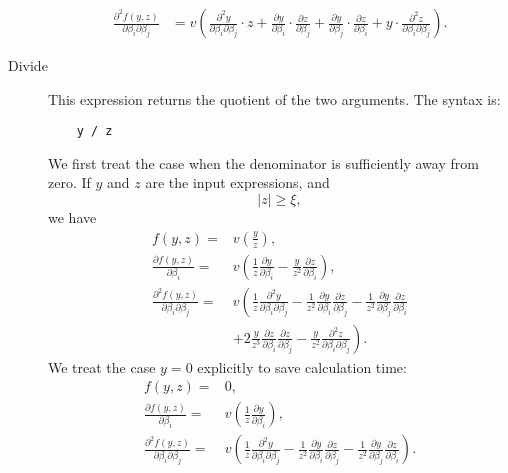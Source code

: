 \documentclass[12pt,a4paper]{article}
\begin{document}
\begin{description}
\begin{align*}
    \frac{\partial^2 f(y, z)}{\partial \beta_i \partial \beta_j} &= v\left(\frac{\partial^2 y}{\partial \beta_i \partial \beta_j} \cdot z + \frac{\partial y}{\partial \beta_i} \cdot \frac{\partial z}{\partial \beta_j} + \frac{\partial y}{\partial \beta_j} \cdot \frac{\partial z}{\partial \beta_i} + y \cdot \frac{\partial^2 z}{\partial \beta_i \partial \beta_j} \right).
  \end{align*}
\item[Divide] This expression returns the quotient of the two arguments. The syntax is: 
  \begin{lstlisting}
    y / z
  \end{lstlisting}

 We first treat the case when the denominator is sufficiently away from zero.        If $y$ and $z$ are the input expressions, and
  \[
  |z| \geq \xi,
  \]
  we have
  \begin{align*}
    f(y, z) =& v\left(\frac{y}{z}\right), \\
    \frac{\partial f(y, z)}{\partial \beta_i} =& v\left(\frac{1}{z}\frac{\partial y}{\partial \beta_i}   - \frac{y}{z^2}  \frac{\partial z}{\partial \beta_i}\right), \\
    \frac{\partial^2 f(y, z)}{\partial \beta_i \partial \beta_j} =&
    v\left( \frac{1}{z}\frac{\partial^2 y}{\partial \beta_i \partial \beta_j} 
    -   \frac{1}{z^2} \frac{\partial y}{\partial \beta_i}  \frac{\partial z}{\partial \beta_j}
    - \frac{1}{z^2}  \frac{\partial y}{\partial \beta_j}  \frac{\partial z}{\partial \beta_i}\right. \\
 & \left.  + 2 \frac{y}{z^3}  \frac{\partial z}{\partial \beta_i}  \frac{\partial z}{\partial \beta_j}
    - \frac{y}{z^2}  \frac{\partial^2 z}{\partial \beta_i \partial \beta_j} \right).
\end{align*}
  We treat the case $y=0$ explicitly to save calculation time:
  \begin{align*}
    f(y, z) =& 0, \\
    \frac{\partial f(y, z)}{\partial \beta_i} =& v\left(\frac{1}{z}\frac{\partial y}{\partial \beta_i}  \right), \\
    \frac{\partial^2 f(y, z)}{\partial \beta_i \partial \beta_j} =&
    v\left( \frac{1}{z}\frac{\partial^2 y}{\partial \beta_i \partial \beta_j} 
    -   \frac{1}{z^2} \frac{\partial y}{\partial \beta_i}  \frac{\partial z}{\partial \beta_j}
    - \frac{1}{z^2}  \frac{\partial y}{\partial \beta_j}  \frac{\partial z}{\partial \beta_i}\right). \\
\end{align*}



\end{description}
\end{document}

